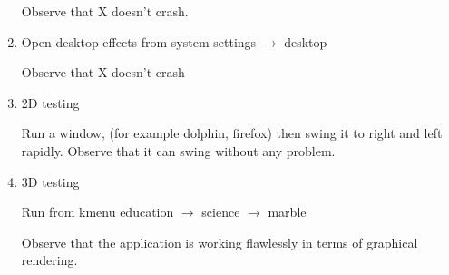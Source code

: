 \documentclass[a4paper,10pt]{article}
\begin{document}
\begin{enumerate}
      Observe that X doesn't crash.
 \item Open desktop effects from system settings $\rightarrow$ desktop
 
      Observe that X doesn't crash
  \item 2D testing 
      
      Run a window, (for example dolphin, firefox) then swing it to right and left rapidly.
        Observe that it can swing without any problem.

 \item 3D testing

    Run from kmenu education $\rightarrow$ science $\rightarrow$ marble
	
    Observe that the application is working flawlessly in terms of graphical rendering.
    \end{enumerate}
\end{document}
